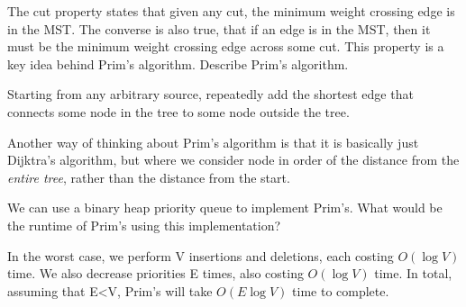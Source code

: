 \begin{blocksection}
The cut property states that given any cut, the minimum weight crossing edge is in the MST. The converse is also true, that if an edge is in the MST, then it must be the minimum weight crossing edge across some cut. This property is a key idea behind Prim's algorithm.
\question Describe Prim's algorithm.

\begin{solution}[0.5in]
Starting from any arbitrary source, repeatedly add the shortest edge that
connects some node in the tree to some node outside the tree.

Another way of thinking about Prim's algorithm is that it is basically just
Dijktra's algorithm, but where we consider node in order of the distance from the
\emph{entire tree}, rather than the distance from the start.
\end{solution}

\question We can use a binary heap priority queue to implement Prim's. What would be the runtime of Prim's using this implementation?  
\begin{solution}[0.75in]
In the worst case, we perform V insertions and deletions, each costing $O(\log V)$ time. We also decrease priorities E times, also costing $O(\log V)$ time. In total, assuming that E\textless  V, Prim's will take $O(E \log V)$ time to complete.

\end{solution}
\end{blocksection}